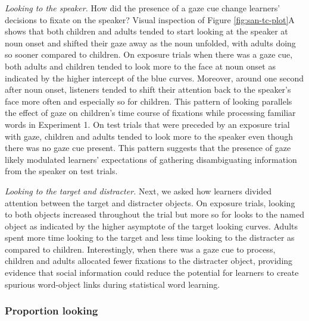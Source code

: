 \documentclass[10pt, letterpaper]{article}
\begin{document}
\emph{Looking to the speaker.} How did the presence of a gaze cue change
learners' decisions to fixate on the speaker? Visual inspection of
Figure \ref{fig:san-tc-plot}A shows that both children and adults tended
to start looking at the speaker at noun onset and shifted their gaze
away as the noun unfolded, with adults doing so sooner compared to
children. On exposure trials when there was a gaze cue, both adults and
children tended to look more to the face at noun onset as indicated by
the higher intercept of the blue curves. Moreover, around one second
after noun onset, listeners tended to shift their attention back to the
speaker's face more often and especially so for children. This pattern
of looking parallels the effect of gaze on children's time course of
fixations while processing familiar words in Experiment 1. On test
trials that were preceded by an exposure trial with gaze, children and
adults tended to look more to the speaker even though there was no gaze
cue present. This pattern suggests that the presence of gaze likely
modulated learners' expectations of gathering disambiguating information
from the speaker on test trials.

\emph{Looking to the target and distracter.} Next, we asked how learners
divided attention between the target and distracter objects. On exposure
trials, looking to both objects increased throughout the trial but more
so for looks to the named object as indicated by the higher asymptote of
the target looking curves. Adults spent more time looking to the target
and less time looking to the distracter as compared to children.
Interestingly, when there was a gaze cue to process, children and adults
allocated fewer fixations to the distracter object, providing evidence
that social information could reduce the potential for learners to
create spurious word-object links during statistical word learning.

\hypertarget{proportion-looking}{%
\subsubsection{Proportion looking}\label{proportion-looking}}
\end{document}
